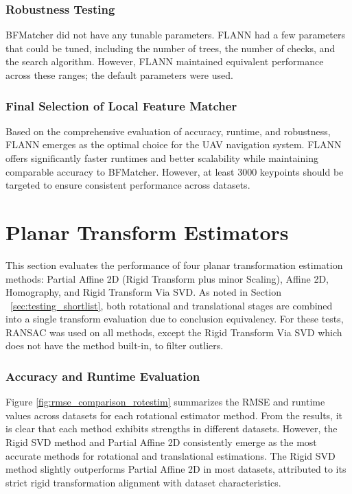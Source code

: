 \subsubsection*{Robustness Testing}
BFMatcher did not have any tunable parameters. FLANN had a few parameters that could be tuned, including the number of trees, the number of checks, and the search algorithm. However, FLANN maintained equivalent performance across these ranges; the default parameters were used. 


\subsubsection*{Final Selection of Local Feature Matcher}

Based on the comprehensive evaluation of accuracy, runtime, and robustness, FLANN emerges as the optimal choice for the UAV navigation system. FLANN offers significantly faster runtimes and better scalability while maintaining comparable accuracy to BFMatcher. However, at least 3000 keypoints should be targeted to ensure consistent performance across datasets.

\vspace{-0.5cm}
\section{Planar Transform Estimators}
\vspace{-0.25cm}

This section evaluates the performance of four planar transformation estimation methods: Partial Affine 2D (Rigid Transform plus minor Scaling), Affine 2D, Homography, and Rigid Transform Via SVD. As noted in Section ~\ref{sec:testing_shortlist}, both rotational and translational stages are combined into a single transform evaluation due to conclusion equivalency. For these tests, RANSAC was used on all methods, except the Rigid Transform Via SVD which does not have the method built-in, to filter outliers.

\subsubsection*{Accuracy and Runtime Evaluation}

Figure \ref{fig:rmse_comparison_rotestim} summarizes the RMSE and runtime values across datasets for each rotational estimator method. From the results, it is clear that each method exhibits strengths in different datasets. However, the Rigid SVD method and Partial Affine 2D consistently emerge as the most accurate methods for rotational and translational estimations. The Rigid SVD method slightly outperforms Partial Affine 2D in most datasets, attributed to its strict rigid transformation alignment with dataset characteristics.

